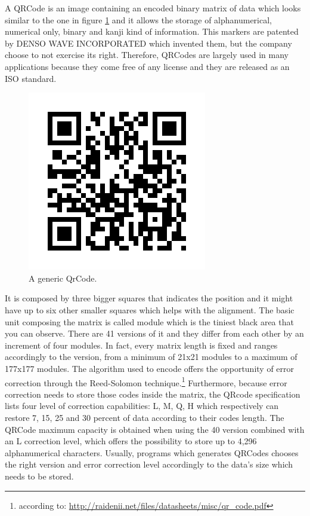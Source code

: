 A QRCode is an image containing an encoded binary matrix of data which looks similar to the one in figure \ref{qr} and it allows the storage of alphanumerical, numerical only, binary and kanji kind of information.
This markers are patented by DENSO WAVE INCORPORATED which invented them, but the company choose to not exercise its right.
Therefore, QRCodes are largely used in many applications because they come free of any license and they are released as an ISO standard.

\begin{figure}[hbt]
    \centering
    \includegraphics[scale=0.5]{img/qr.png}
    \caption{A generic QrCode. \label{qr}}
\end{figure}

It is composed by three bigger squares that indicates the position and it might have up to six other smaller squares which helps with the alignment. The basic unit composing the matrix is called module which is the tiniest black area that you can observe. There are 41 versions of it and they differ from each other by an increment of four modules. In fact, every matrix length is fixed and ranges accordingly to the version, from a minimum of 21x21 modules to a maximum of 177x177 modules. The algorithm used to encode offers the opportunity of error correction through the Reed-Solomon technique.\footnote{ according to: \url{http://raidenii.net/files/datasheets/misc/qr_code.pdf}}
Furthermore, because error correction needs to store those codes inside the matrix, the QRcode specification lists four level of correction capabilities: L, M, Q, H which respectively can restore 7, 15, 25 and 30 percent of data according to their codes length\cite{qrerror}.
The QRCode maximum capacity is obtained when using the 40 version combined with an L correction level, which offers the possibility to store up to 4,296 alphanumerical characters\cite{qrversions}.
Usually, programs which generates QRCodes chooses the right version and error correction level accordingly to the data's size which needs to be stored.


